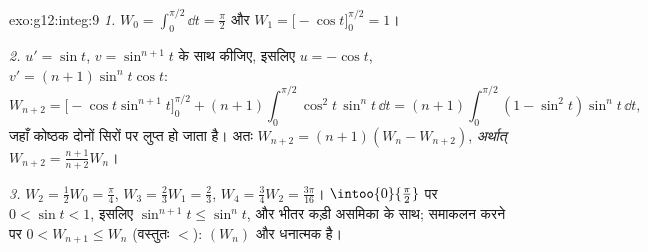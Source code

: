 \begin{solution}{exo:g12:integ:9}
\emph{1.} $W_0 = \int_0^{\pi/2} \dd t = \frac{\pi}{2}$ और $W_1 = \bigl[-\cos t\bigr]_0^{\pi/2} = 1$।

\emph{2.} $u' = \sin t$, $v = \sin^{n+1} t$ के साथ  कीजिए, इसलिए $u = -\cos t$, $v' = (n+1)\sin^n t \cos t$:
\[
W_{n+2} = \bigl[-\cos t \sin^{n+1} t\bigr]_0^{\pi/2}
+ (n+1)\int_0^{\pi/2} \cos^2 t\,\sin^n t\,\dd t
= (n+1)\int_0^{\pi/2} (1 - \sin^2 t)\sin^n t\,\dd t,
\]
जहाँ कोष्ठक दोनों सिरों पर लुप्त हो जाता है। अतः $W_{n+2} = (n+1)(W_n - W_{n+2})$, \emph{अर्थात्} $W_{n+2} = \frac{n+1}{n+2} W_n$।

\emph{3.} $W_2 = \frac12 W_0 = \frac{\pi}{4}$, $W_3 = \frac23 W_1 = \frac23$, $W_4 = \frac34 W_2 = \frac{3\pi}{16}$। $\intoo{0}{\frac\pi2}$ पर $0 < \sin t < 1$, इसलिए $\sin^{n+1} t \leq \sin^n t$, और भीतर कड़ी असमिका के
साथ; समाकलन करने पर $0 < W_{n+1} \leq W_n$ (वस्तुतः $<$): $(W_n)$  और धनात्मक है।
\end{solution}

